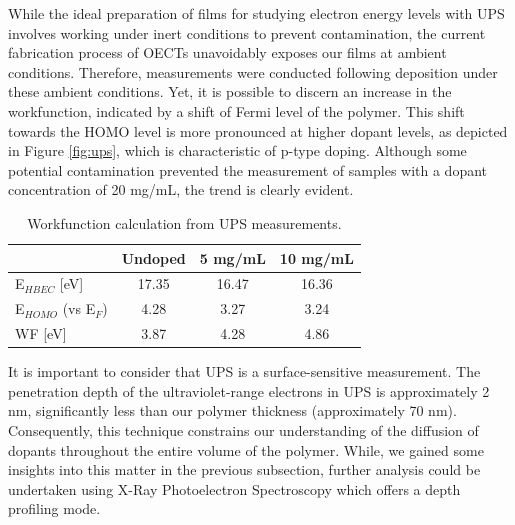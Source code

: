 While the ideal preparation of films for studying electron energy levels with UPS involves working under inert conditions to prevent contamination, the current fabrication process of OECTs unavoidably exposes our films at ambient conditions. Therefore, measurements were conducted following deposition under these ambient conditions. Yet, it is possible to discern an increase in the workfunction, indicated by a shift of Fermi level of the polymer. This shift towards the HOMO level is more pronounced at higher dopant levels, as depicted in Figure \ref{fig:ups}, which is characteristic of p-type doping. Although some potential contamination prevented the measurement of samples with a dopant concentration of 20 mg/mL, the trend is clearly evident.

\begin{table}[ht]
\centering
\caption{Workfunction calculation from UPS measurements.}
\begin{tabular}{l|c|c|c}
& Undoped & 5 mg/mL & 10 mg/mL \\\hline
E$_{HBEC}$ [eV] & 17.35 & 16.47 & 16.36\\
E$_{HOMO}$ (vs E$_{F}$) & 4.28 & 3.27 & 3.24\\
WF [eV] & 3.87 & 4.28 & 4.86\\\hline
\end{tabular}
\label{tab:ups}
\end{table}

It is important to consider that UPS is a surface-sensitive measurement. The penetration depth of the ultraviolet-range electrons in UPS is approximately 2 nm, significantly less than our polymer thickness (approximately 70 nm). Consequently, this technique constrains our understanding of the diffusion of dopants throughout the entire volume of the polymer. While, we gained some insights into this matter in the previous subsection, further analysis could be undertaken using X-Ray Photoelectron Spectroscopy which offers a depth profiling mode. %

